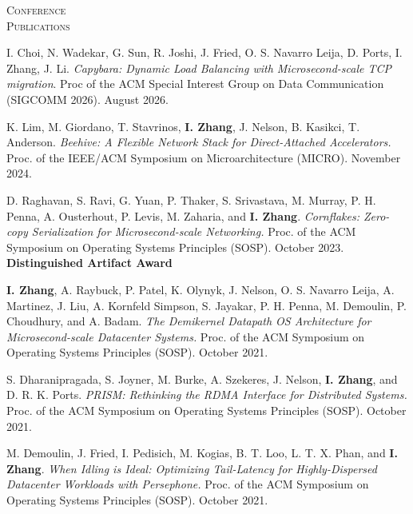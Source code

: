 \documentclass[10pt,times]{report}
\newlength{\sectiongap}
\newlength{\sectioncolwidth}
\newlength{\colgap}
\newlength{\stuffwidth}
\newenvironment{rtable}{
  \begin{minipage}{\textwidth}
  }{
  \end{minipage}
}
\newenvironment{rsection}[1]{
  \begin{minipage}[t]{\sectioncolwidth}
    \textsc{#1}
  \end{minipage}
  \hspace{\colgap}
  \begin{minipage}[t]{\stuffwidth}
  }{
    \removelastskip
  \end{minipage}
  \\[\sectiongap]
}
\begin{document}
\begin{rtable}
  
  \begin{rsection}{Conference\\Publications}
   I. Choi, N. Wadekar, G. Sun, R. Joshi, J. Fried, O. S. Navarro
   Leija, D. Ports, I. Zhang, J. Li. \textit{Capybara: Dynamic Load
     Balancing with Microsecond-scale TCP migration}. Proc of the ACM
   Special Interest Group on Data Communication (SIGCOMM 2026). August
   2026.  \\\vspace{-0.5em}
    
    K. Lim, M. Giordano, T. Stavrinos, \textbf{I. Zhang}, J. Nelson,
    B. Kasikci, T. Anderson. \textit{Beehive: A Flexible
    Network Stack for Direct-Attached Accelerators.} Proc. of the IEEE/ACM Symposium
    on Microarchitecture (MICRO). November 2024. \\\vspace{-0.5em}
    
    D. Raghavan, S. Ravi, G. Yuan, P. Thaker, S. Srivastava,
    M. Murray, P. H. Penna, A. Ousterhout, P. Levis, M. Zaharia, and
    \textbf{I. Zhang}.  \textit{Cornflakes: Zero-copy Serialization
      for Microsecond-scale Networking.}  Proc. of the ACM Symposium
    on Operating Systems Principles (SOSP). October
    2023. \textbf{Distinguished Artifact Award} \\\vspace{-0.5em}

    \textbf{I. Zhang}, A. Raybuck, P. Patel, K. Olynyk, J. Nelson,
    O. S. Navarro Leija, A. Martinez, J. Liu, A. Kornfeld Simpson,
    S. Jayakar, P. H.  Penna, M. Demoulin, P. Choudhury, and
    A. Badam. \textit{The Demikernel Datapath OS Architecture for
      Microsecond-scale Datacenter Systems.  } Proc. of the ACM
    Symposium on Operating Systems Principles (SOSP). October
    2021. \\\vspace{-0.5em}

    S. Dharanipragada, S. Joyner, M. Burke, A.  Szekeres, J. Nelson,
    \textbf{I. Zhang}, and D. R. K. Ports. \textit{PRISM: Rethinking
      the RDMA Interface for Distributed Systems.}  Proc. of the
    ACM Symposium on Operating Systems Principles (SOSP). October
    2021. \\\vspace{-0.5em}

    M. Demoulin, J. Fried, I. Pedisich, M. Kogias, B. T. Loo,
    L. T. X. Phan, and \textbf{I. Zhang}. \textit{When Idling is
      Ideal: Optimizing Tail-Latency for Highly-Dispersed Datacenter
      Workloads with Persephone.  } Proc. of the ACM Symposium
    on Operating Systems Principles (SOSP). October
    2021. \\\vspace{-0.5em}


\end{rsection}
\end{rtable}
\end{document}
